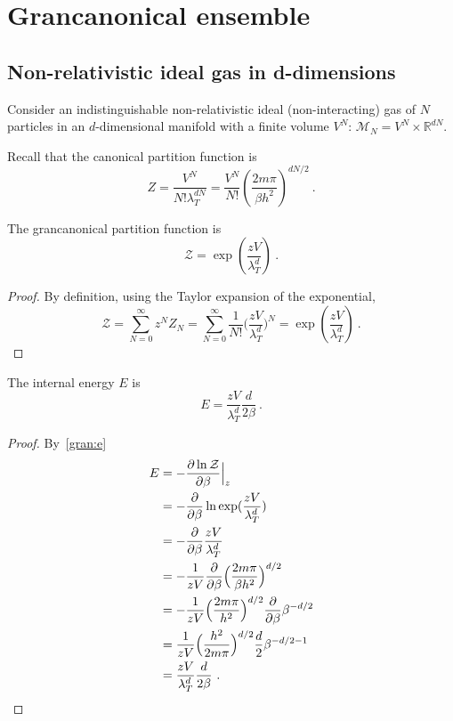 \chapter{Grancanonical ensemble}

\section{Non-relativistic ideal gas in d-dimensions}

    Consider an indistinguishable non-relativistic ideal (non-interacting) gas of $N$ particles in an $d$-dimensional manifold with a finite volume $V^N$: $\mathcal M_N = V^N \times \mathbb R^{dN}$. 

    Recall that the canonical partition function is
    \begin{equation*}
        Z = \frac{V^N}{N! \lambda^{dN}_T} = \frac{V^N}{N!} (\frac{2 m \pi}{\beta h^2})^{dN/2} ~.
    \end{equation*}

    The grancanonical partition function is 
    \begin{equation*}
        \mathcal Z = \exp(\frac{z V}{\lambda_T^d}) ~.
     \end{equation*}
    \begin{proof}
        By definition, using the Taylor expansion of the exponential,
        \begin{equation*}
            \mathcal Z = \sum_{N=0}^\infty z^N Z_N = \sum_{N=0}^\infty \frac{1}{N!} \Big ( \frac{z V}{\lambda_T^d} \Big)^N = \exp(\frac{z V}{\lambda_T^d}) ~.
        \end{equation*}
    \end{proof}
    
    The internal energy $E$ is 
    \begin{equation*}
        E = \frac{z V}{\lambda^d_T} \frac{d}{2 \beta} ~.
    \end{equation*}
    \begin{proof}
        By~\eqref{gran:e}
        \begin{equation*}
        \begin{aligned}
            E & = - \frac{\partial\ln \mathcal Z}{\partial\beta} \Big \vert_z \\ & = - \frac{\partial}{\partial\beta} \ln \exp(\frac{z V}{\lambda_T^d}) \\ & = - \frac{\partial}{\partial\beta} \frac{z V}{\lambda^d_T} \\ & = - \frac{1}{zV} \frac{\partial}{\partial\beta} \Big ( \frac{2 m \pi} {\beta h^2} \Big )^{d/2} \\ & = - \frac{1}{z V} \Big ( \frac{2 m \pi}{h^2} \Big )^{d/2} \frac{\partial}{\partial\beta} \beta^{-d/2} \\ & = \frac{1}{zV} \Big ( \frac{h^2}{2 m \pi} \Big )^{d/2} \frac{d}{2} \beta^{-d/2 - 1} \\ & = \frac{z V}{\lambda^d_T} \frac{d}{2 \beta} ~.
        \end{aligned}
        \end{equation*}
    \end{proof}
    
